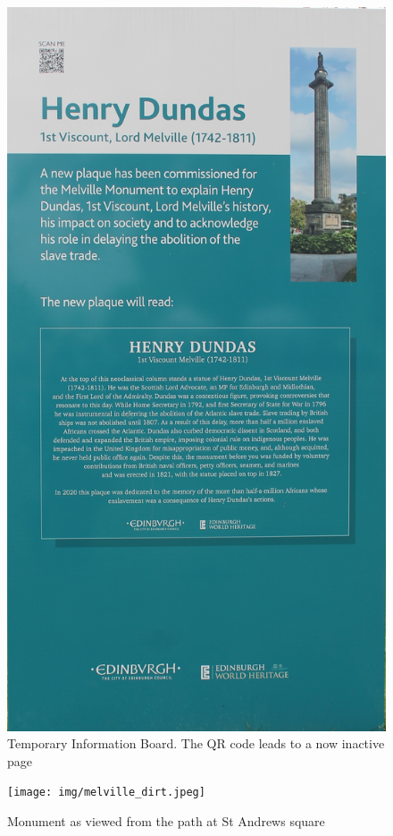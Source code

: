 \documentclass{scrartcl}
\begin{document}
\begin{appendices}
\begin{figure}
    \includegraphics[height=1\textheight]{img/melville_temp.jpg}
    \caption{Temporary Information Board. The QR code leads to a now inactive page}
    \label{fig:temp_info}
\end{figure}
\begin{figure}
    \centering
    \texttt{[image: img/melville\_dirt.jpeg]}
    \caption{Monument as viewed from the path at St Andrews square}
    \label{fig:melville-dirt}
\end{figure}


\end{appendices}
\end{document}

